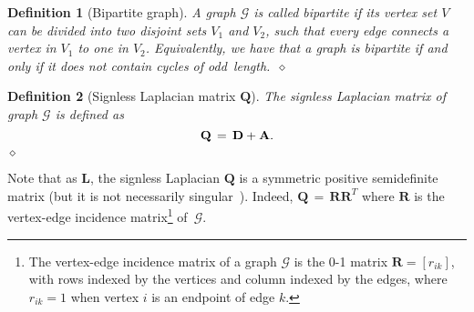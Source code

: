 \documentclass[letterpaper,9pt,twocolumn]{autart}
\newcommand{\vet}[1]{\ensuremath{{\mathbf #1}}}
\newtheorem{definition}{\textbf{Definition}}
\begin{document}
\begin{definition}[Bipartite graph] A graph $\mathcal{G}$ is called bipartite if its vertex set $V$ can be divided into
two disjoint sets $V_1$ and $V_2$, such that every edge connects a vertex in
$V_1$ to one in $V_2$. Equivalently, we have that a graph is bipartite if and only if it does not contain cycles of odd~length.~\hfill$\diamond$
\end{definition}



\begin{definition}[Signless Laplacian matrix $\vet{Q}$] The signless Laplacian matrix of graph $\mathcal{G}$ is defined as \cite{CvetkovicRoSi_LAA07}
$$
\vet{Q} \,=\, \vet{D} + \vet{A}. \vspace{-0.65cm}
$$
\hfill$\diamond$
\end{definition}
Note that as $\vet{L}$, the signless Laplacian $\vet{Q}$ is a
symmetric positive semidefinite matrix (but it is not necessarily \mbox{singular}~\cite{BrouwerHa_book12}).
Indeed, $\vet{Q} \,=\, \vet{R}\vet{R}^T$ where $\vet{R}$ is
the vertex-edge incidence matrix\footnote{The vertex-edge incidence
matrix of a graph $\mathcal{G}$ is the \mbox{0-1} matrix $\vet{R} = [r_{ik}]$, with rows indexed by
the vertices and column indexed by the edges, where $r_{ik} = 1$ when
vertex $i$ is an endpoint of edge $k$.} of~$\mathcal{G}$.
\end{document}
